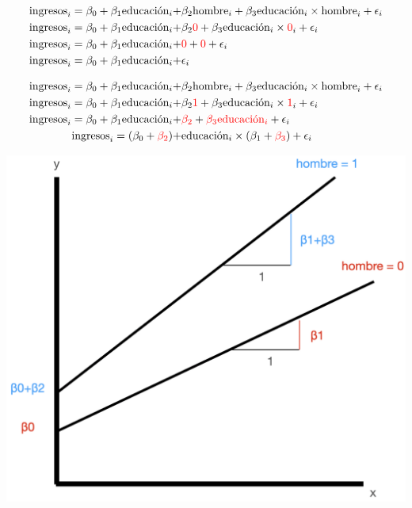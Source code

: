 \documentclass[onesided]{article}\usepackage[]{graphicx}\usepackage[]{color}
\makeatletter
\def\maxwidth{ %
  \ifdim\Gin@nat@width>\linewidth
    \linewidth
  \else
    \Gin@nat@width
  \fi
}
\makeatother
\begin{document}
    \begin{equation}\label{eq:int:term:0}
    \begin{split}
      \text{ingresos}_{i}  = \beta_{0} + \beta_{1}\text{educaci\'on}_{i} +& \beta_{2}\text{hombre}_{i} + \beta_{3}{\text{educaci\'on}_{i} \times \text{hombre}}_{i}  + \epsilon_{i}\\
      \text{ingresos}_{i}  = \beta_{0} + \beta_{1}\text{educaci\'on}_{i} +& \beta_{2}{\color{red}0} + \beta_{3}{\text{educaci\'on}_{i} \times {\color{red}0}}_{i}  + \epsilon_{i}\\
      \text{ingresos}_{i} = \beta_{0} + \beta_{1}\text{educaci\'on}_{i}  +& {\color{red}0} + {\color{red}0}  + \epsilon_{i}\\
      \text{ingresos}_{i} = \beta_{0} + \beta_{1}\text{educaci\'on}_{i}  +& \epsilon_{i}
      \end{split}
    \end{equation}

    \begin{equation}\label{eq:int:term:1}
    \begin{split}
      \text{ingresos}_{i}  = \beta_{0} + \beta_{1}\text{educaci\'on}_{i} +& \beta_{2}\text{hombre}_{i} + \beta_{3}{\text{educaci\'on}_{i} \times \text{hombre}}_{i}  + \epsilon_{i}\\
      \text{ingresos}_{i}  = \beta_{0} + \beta_{1}\text{educaci\'on}_{i} +& \beta_{2}{\color{red}1} + \beta_{3}{\text{educaci\'on}_{i} \times {\color{red}1}}_{i}  + \epsilon_{i}\\
      \text{ingresos}_{i} = \beta_{0} + \beta_{1}\text{educaci\'on}_{i}  +& {\color{red}\beta_{2}} + {\color{red}\beta_{3}{\text{educaci\'on}_{i}}}  + \epsilon_{i}\\
      \text{ingresos}_{i} = (\beta_{0} + {\color{red}\beta_{2}}) +& \text{educaci\'on}_{i}\times(\beta_{1}+{\color{red}\beta_{3}})  + \epsilon_{i}
      \end{split}
    \end{equation}


{\centering \includegraphics[width=\maxwidth]{it.png}}
\end{document}
